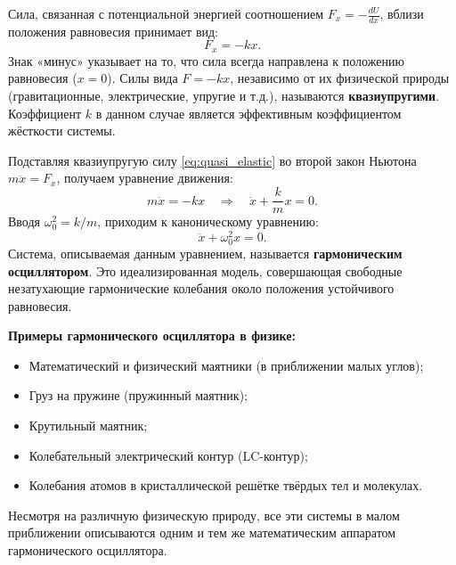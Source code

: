 \begin{definition}
Сила, связанная с потенциальной энергией соотношением $F_x = -\frac{dU}{dx}$, вблизи положения равновесия принимает вид:
\begin{equation}
    F_x = -kx. \label{eq:quasi_elastic}
\end{equation}
Знак «минус» указывает на то, что сила всегда направлена к положению равновесия ($x=0$). Силы вида $F = -kx$, независимо от их физической природы (гравитационные, электрические, упругие и т.д.), называются \textbf{квазиупругими}. Коэффициент $k$ в данном случае является эффективным коэффициентом жёсткости системы.
\end{definition}

\begin{theorem}
Подставляя квазиупругую силу \eqref{eq:quasi_elastic} во второй закон Ньютона $m\ddot{x} = F_x$, получаем уравнение движения:
\begin{equation}
    m\ddot{x} = -kx \quad \Rightarrow \quad \ddot{x} + \frac{k}{m}x = 0.
\end{equation}
Вводя $\omega_0^2 = k/m$, приходим к каноническому уравнению:
\begin{equation}
    \ddot{x} + \omega_0^2 x = 0. \label{eq:harmonic_osc}
\end{equation}
Система, описываемая данным уравнением, называется \textbf{гармоническим осциллятором}. Это идеализированная модель, совершающая свободные незатухающие гармонические колебания около положения устойчивого равновесия.
\end{theorem}

\begin{remark}
\textbf{Примеры гармонического осциллятора в физике:}
\begin{itemize}
    \item Математический и физический маятники (в приближении малых углов);
    \item Груз на пружине (пружинный маятник);
    \item Крутильный маятник;
    \item Колебательный электрический контур (LC-контур);
    \item Колебания атомов в кристаллической решётке твёрдых тел и молекулах.
\end{itemize}
Несмотря на различную физическую природу, все эти системы в малом приближении описываются одним и тем же математическим аппаратом гармонического осциллятора.
\end{remark}
